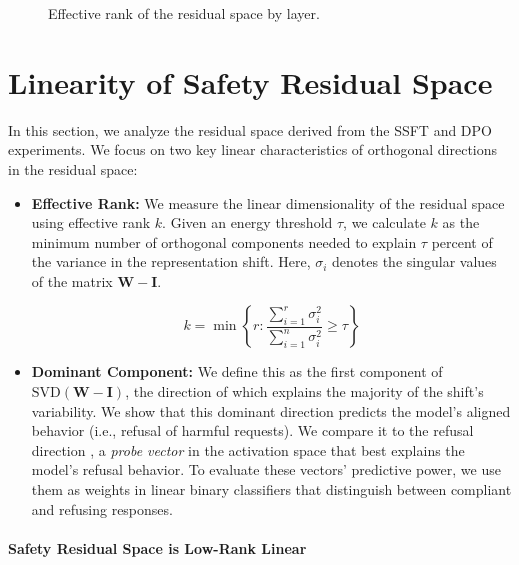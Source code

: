 \begin{figure}
    \vskip 0.2in
    \begin{center}
    \vspace{-0.2in}
    \caption{Effective rank of the residual space by layer.}
    \label{fig:rank}
    \end{center}
\end{figure}

\section{Linearity of Safety Residual Space}
\label{sec:linear}

In this section, we analyze the residual space derived from the SSFT and DPO experiments. We focus on two key linear characteristics of orthogonal directions in the residual space:

\begin{itemize}
    \item \textbf{Effective Rank:} We measure the linear dimensionality of the residual space using effective rank $k$. Given an energy threshold $\tau$, we calculate $k$ as the minimum number of orthogonal components needed to explain $\tau$ percent of the variance in the representation shift. Here, $\sigma_i$ denotes the singular values of the matrix $\mathbf{W} - \mathbf{I}$.

    \[
        k = \min \left\{ r : \frac{\sum_{i=1}^{r} \sigma_i^2}{\sum_{i=1}^{n} \sigma_i^2} \geq \tau \right\}
    \]
    
    \item \textbf{Dominant Component:} We define this as the first component of $\mathrm{SVD}(\mathbf{W} - \mathbf{I})$, the direction of which explains the majority of the shift's variability. We show that this dominant direction predicts the model's aligned behavior (i.e., refusal of harmful requests). We compare it to the refusal direction \cite{arditi2024refusal}, a \emph{probe vector} in the activation space that best explains the model's refusal behavior. To evaluate these vectors' predictive power, we use them as weights in linear binary classifiers that distinguish between compliant and refusing responses.
\end{itemize}

\paragraph{Safety Residual Space is Low-Rank Linear}

